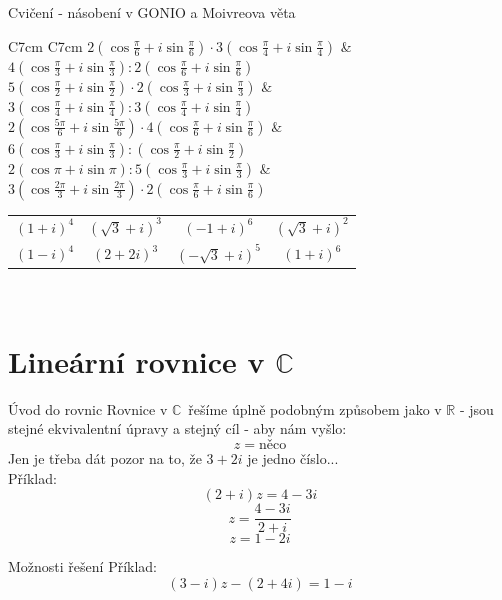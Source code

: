 \documentclass[aspectratio=169]{beamer} %
\newcommand{\C}{$\mathbb{C}$}
\newcommand{\reseni}[1]{\ \hfill \hyperlink{#1}{\beamergotobutton{\Large Řešení}}}
\begin{document}
	\begin{frame}[label=C5]{Cvičení - násobení v GONIO a Moivreova věta}
	 \begin{tabular}{C{7cm} C{7cm}}
	 $  2\left(\cos \frac{\pi}{6} + i \sin \frac{\pi}{6}\right) \cdot
	 3\left(\cos \frac{\pi}{4} + i \sin \frac{\pi}{4}\right) $
	 & $ 4\left(\cos \frac{\pi}{3} + i \sin \frac{\pi}{3}\right) :
	 2\left(\cos \frac{\pi}{6} + i \sin \frac{\pi}{6}\right) $ \\
	 $ 5\left(\cos \frac{\pi}{2} + i \sin \frac{\pi}{2}\right)  \cdot
	 2\left(\cos \frac{\pi}{3} + i \sin \frac{\pi}{3}\right) $
	 & $ 3\left(\cos \frac{\pi}{4} + i \sin \frac{\pi}{4}\right) :
	 3\left(\cos \frac{\pi}{4} + i \sin \frac{\pi}{4}\right)$ \\
	 $ 2\left(\cos \frac{5\pi}{6} + i \sin \frac{5\pi}{6}\right) \cdot 
	 4\left(\cos \frac{\pi}{6} + i \sin \frac{\pi}{6}\right)$
	 & $ 6\left(\cos \frac{\pi}{3} + i \sin \frac{\pi}{3}\right):
	 \left( \cos \frac{\pi}{2} + i \sin \frac{\pi}{2}\right) $ \\
	 $ 2\left(\cos \pi + i \sin \pi\right) :
	 5\left(\cos \frac{\pi}{3} + i \sin \frac{\pi}{3}\right) $
	 & $ 3\left(\cos \frac{2\pi}{3} + i \sin \frac{2\pi}{3}\right) \cdot
	 2\left(\cos \frac{\pi}{6} + i \sin \frac{\pi}{6}\right)$
	 \end{tabular}
	 
	 \begin{tabular}{cccc}
	  $(1+i)^4$ & $(\sqrt{3}+i)^3$ & $(-1+i)^6$ & $(\sqrt{3}+ i)^2$ \\
	  $(1-i)^4$ & $(2+2i)^3$ & $(-\sqrt{3}+i)^5$ & $(1+i)^6$
	 \end{tabular}
	\reseni{Ř5}
	\end{frame}
	
\section{Lineární rovnice v $\mathbb{C}$}

	\begin{frame}{Úvod do rovnic}
	 Rovnice v \C \ řešíme úplně podobným způsobem jako v $\mathbb{R}$ - jsou stejné ekvivalentní úpravy a stejný cíl - aby nám vyšlo: $$z=\text{něco}$$
	 Jen je třeba dát pozor na to, že $3+2i$ je jedno číslo...\\
	 Příklad: 
	 $$(2+i)z=4-3i$$ $$z=\dfrac{4-3i}{2+i}$$ $$z=1-2i$$
	\end{frame} 
	
	\begin{frame}{Možnosti řešení}
     Příklad:$$(3-i)z-(2+4i)=1-i$$
	\end{frame}
	
\end{document}
